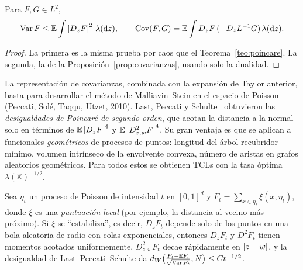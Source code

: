 \begin{teorema}
Para $F,G\in L^2$,
\[
  \operatorname{Var} F\le\mathbb{E}\int\left\lvert D_zF\right\rvert^2\,\lambda(\mathrm{d} z),\qquad\operatorname{Cov}(F,G)=\mathbb{E}\int D_zF\,(-D_zL^{-1}G)\,\lambda(\mathrm{d} z).
\]
\end{teorema}

\begin{proof}
La primera es la misma prueba por caos que el Teorema~\ref{teo:poincare}. La segunda, la de
la Proposición~\ref{prop:covarianzas}, usando solo la dualidad.
\end{proof}

La representación de covarianzas, combinada con la expansión de Taylor anterior, basta
para desarrollar el método de Malliavin--Stein en el espacio de Poisson (Peccati, Solé, Taqqu,
Utzet, 2010). Last, Peccati y Schulte~\cite{LastPeccatiSchulte16} obtuvieron las \emph{desigualdades de Poincaré de segundo
orden}, que acotan la distancia a la normal solo en términos de $\mathbb{E}\left\lvert D_zF\right\rvert^4$ y $\mathbb{E}\left\lvert D^2_{z,w}F\right\rvert^4$. Su gran
ventaja es que se aplican a funcionales \emph{geométricos} de procesos de puntos: longitud del árbol
recubridor mínimo, volumen intrínseco de la envolvente convexa, número de aristas en grafos
aleatorios geométricos. Para todos estos se obtienen TCLs con la tasa óptima $\lambda(\mathbb X)^{-1/2}$.

\begin{ejemplo}[Estabilización]
Sea $\eta_t$ un proceso de Poisson de intensidad $t$ en $[0,1]^d$ y
$F_t=\sum_{x\in\eta_t}\xi(x,\eta_t)$, donde $\xi$ es una \emph{puntuación local} (por ejemplo, la distancia al vecino
más próximo). Si $\xi$ se ``estabiliza'', es decir, $D_zF_t$ depende solo de los puntos en una bola
aleatoria de radio con colas exponenciales, entonces $D_zF_t$ y $D^2F_t$ tienen momentos acotados
uniformemente, $D^2_{z,w}F_t$ decae rápidamente en $\left\lvert z-w\right\rvert$, y la desigualdad de Last--Peccati--Schulte
da $d_W\big(\frac{F_t-\mathbb{E} F_t}{\sqrt{\operatorname{Var} F_t}},N\big)\le Ct^{-1/2}$.
\end{ejemplo}

